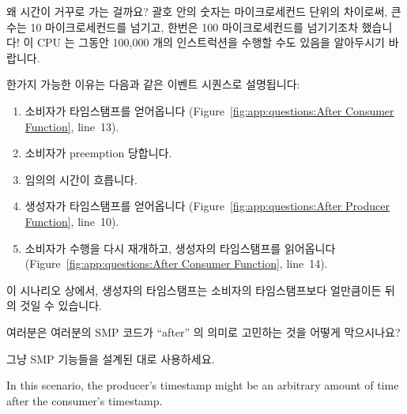 왜 시간이 거꾸로 가는 걸까요?
괄호 안의 숫자는 마이크로세컨드 단위의 차이로써, 큰 수는 10 마이크로세컨드를
넘기고, 한번은 100 마이크로세컨드를 넘기기조차 했습니다!
이 CPU 는 그동안 100,000 개의 인스트럭션을 수행할 수도 있음을 알아두시기
바랍니다.

한가지 가능한 이유는 다음과 같은 이벤트 시퀀스로 설명됩니다:
\iffalse

Why is time going backwards?
The number in parentheses is the difference in microseconds, with
a large number exceeding 10 microseconds, and one exceeding even
100 microseconds!
Please note that this CPU can potentially execute more than 100,000
instructions in that time.

One possible reason is given by the following sequence of events:
\fi
\begin{enumerate}
\item	소비자가 타임스탬프를 얻어옵니다
	(Figure~\ref{fig:app:questions:After Consumer Function}, line~13).
\item	소비자가 preemption 당합니다.
\item	임의의 시간이 흐릅니다.
\item	생성자가 타임스탬프를 얻어옵니다
	(Figure~\ref{fig:app:questions:After Producer Function}, line~10).
\item	소비자가 수행을 다시 재개하고, 생성자의 타임스탬프를 읽어옵니다
	(Figure~\ref{fig:app:questions:After Consumer Function}, line~14).
\iffalse

\item	Consumer obtains timestamp
	(Figure~\ref{fig:app:questions:After Consumer Function}, line~13).
\item	Consumer is preempted.
\item	An arbitrary amount of time passes.
\item	Producer obtains timestamp
	(Figure~\ref{fig:app:questions:After Producer Function}, line~10).
\item	Consumer starts running again, and picks up the producer's
	timestamp
	(Figure~\ref{fig:app:questions:After Consumer Function}, line~14).
\fi
\end{enumerate}

이 시나리오 상에서, 생성자의 타임스탬프는 소비자의 타임스탬프보다 얼만큼이든
뒤의 것일 수 있습니다.

여러분은 여러분의 SMP 코드가 ``after'' 의 의미로 고민하는 것을 어떻게
막으시나요?

그냥 SMP 기능들을 설계된 대로 사용하세요.
\iffalse

In this scenario, the producer's timestamp might be an arbitrary
amount of time after the consumer's timestamp.

